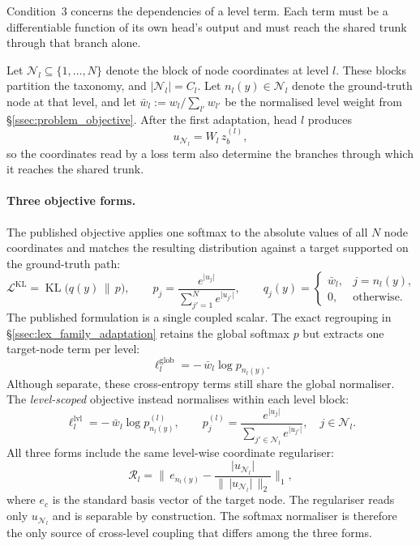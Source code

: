 Condition~3 concerns the dependencies of a level term. Each term must be a differentiable function
of its own head's output and must reach the shared trunk through that branch
alone.

Let $\mathcal{N}_l\subseteq\{1,\dots,N\}$ denote the block of node coordinates
at level $l$. These blocks partition the taxonomy, and
$\lvert\mathcal{N}_l\rvert=C_l$. Let $n_l(y)\in\mathcal{N}_l$ denote the
ground-truth node at that level, and let
$\bar w_l:=w_l/\sum_{l'}w_{l'}$ be the normalised level weight from
\S\ref{ssec:problem_objective}. After the first adaptation, head $l$ produces
\[
u_{\mathcal{N}_l}=W_l\,z_b^{(l)} ,
\]
so the coordinates read by a loss term also determine the branches through
which it reaches the shared trunk.

\paragraph{Three objective forms.} The published objective applies one softmax
to the absolute values of all $N$ node coordinates and matches the resulting
distribution against a target supported on the ground-truth path:
\[
\mathcal{L}^{\mathrm{KL}}=\operatorname{KL}\!\big(q(y)\,\big\|\,p\big),
\qquad
p_j=\frac{e^{\lvert u_j\rvert}}{\sum_{j'=1}^{N}e^{\lvert u_{j'}\rvert}},
\qquad
q_j(y)=
\begin{cases}
\bar w_l, & j=n_l(y),\\[2pt]
0, & \text{otherwise.}
\end{cases}
\]
The published formulation is a single coupled scalar. The exact regrouping in
\S\ref{ssec:lex_family_adaptation} retains the global softmax $p$ but extracts
one target-node term per level:
\[
\ell^{\mathrm{glob}}_l=-\,\bar w_l\log p_{n_l(y)} .
\]
Although separate, these cross-entropy terms still share the global normaliser.
The \emph{level-scoped} objective instead normalises within each level block:
\[
\ell^{\mathrm{lvl}}_l=-\,\bar w_l\log p^{(l)}_{n_l(y)},
\qquad
p^{(l)}_j=\frac{e^{\lvert u_j\rvert}}{\sum_{j'\in\mathcal{N}_l}e^{\lvert u_{j'}\rvert}},
\quad j\in\mathcal{N}_l .
\]
All three forms include the same level-wise coordinate regulariser:
\[
\mathcal{R}_l=\Big\lVert\,e_{n_l(y)}-\frac{\lvert u_{\mathcal{N}_l}\rvert}{\big\lVert\,\lvert u_{\mathcal{N}_l}\rvert\,\big\rVert_2}\Big\rVert_1 ,
\]
where $e_c$ is the standard basis vector of the target node. The regulariser
reads only $u_{\mathcal{N}_l}$ and is separable by construction. The softmax
normaliser is therefore the only source of cross-level coupling that differs
among the three forms.

